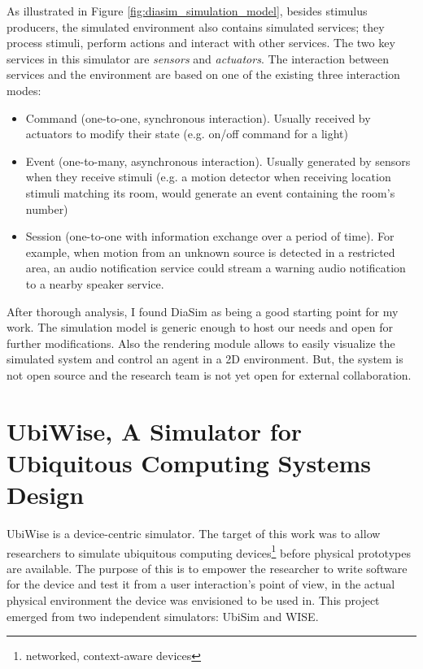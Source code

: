 As illustrated in Figure \ref{fig:diasim_simulation_model}, besides stimulus producers, the simulated environment also contains simulated services; they process stimuli, perform actions and interact with other services. The two key services in this simulator are \emph{sensors} and \emph{actuators}. The interaction between services and the environment are based on one of the existing three interaction modes:
\begin{itemize}
	\item Command (one-to-one, synchronous interaction). Usually received by actuators to modify their state (e.g. on/off command for a light)
	\item Event (one-to-many, asynchronous interaction). Usually generated by sensors when they receive stimuli (e.g. a motion detector when receiving location stimuli matching its room, would generate an event containing the room's number)
	\item Session (one-to-one with information exchange over a period of time). For example, when motion from an unknown source is detected in a restricted area, an audio notification service could stream a warning audio notification to a nearby speaker service.
\end{itemize}

After thorough analysis, I found DiaSim as being a good starting point for my work. The simulation model is generic enough to host our needs and open for further modifications. Also the rendering module allows to easily visualize the simulated system and control an agent in a 2D environment. But, the system is not open source and the research team is not yet open for external collaboration.

\section{UbiWise, A Simulator for Ubiquitous Computing Systems Design}\label{sec:ubiwise}

UbiWise \cite{barton2003ubiwise} is a device-centric simulator. The target of this work was to allow researchers to simulate ubiquitous computing devices\footnote{networked, context-aware devices} before physical prototypes are available. The purpose of this is to empower the researcher to write software for the device and test it from a user interaction's point of view, in the actual physical environment the device was envisioned to be used in. This project emerged from two independent simulators: UbiSim and WISE.\\

